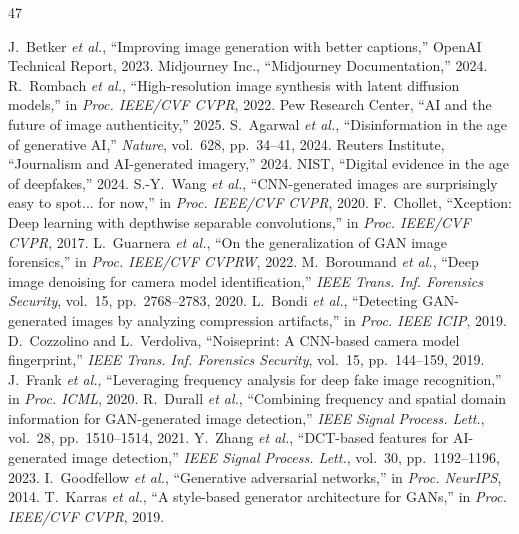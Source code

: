 \documentclass[journal]{IEEEtran}
\begin{document}
\begin{thebibliography}{47}

 J.~Betker \textit{et al.}, ``Improving image generation with better captions,'' OpenAI Technical Report, 2023.
 Midjourney Inc., ``Midjourney Documentation,'' 2024.
 R.~Rombach \textit{et al.}, ``High-resolution image synthesis with latent diffusion models,'' in \textit{Proc. IEEE/CVF CVPR}, 2022.
 Pew Research Center, ``AI and the future of image authenticity,'' 2025.
 S.~Agarwal \textit{et al.}, ``Disinformation in the age of generative AI,'' \textit{Nature}, vol.~628, pp.~34--41, 2024.
 Reuters Institute, ``Journalism and AI-generated imagery,'' 2024.
 NIST, ``Digital evidence in the age of deepfakes,'' 2024.
 S.-Y.~Wang \textit{et al.}, ``CNN-generated images are surprisingly easy to spot... for now,'' in \textit{Proc. IEEE/CVF CVPR}, 2020.
 F.~Chollet, ``Xception: Deep learning with depthwise separable convolutions,'' in \textit{Proc. IEEE/CVF CVPR}, 2017.
 L.~Guarnera \textit{et al.}, ``On the generalization of GAN image forensics,'' in \textit{Proc. IEEE/CVF CVPRW}, 2022.
 M.~Boroumand \textit{et al.}, ``Deep image denoising for camera model identification,'' \textit{IEEE Trans. Inf. Forensics Security}, vol.~15, pp.~2768--2783, 2020.
 L.~Bondi \textit{et al.}, ``Detecting GAN-generated images by analyzing compression artifacts,'' in \textit{Proc. IEEE ICIP}, 2019.
 D.~Cozzolino and L.~Verdoliva, ``Noiseprint: A CNN-based camera model fingerprint,'' \textit{IEEE Trans. Inf. Forensics Security}, vol.~15, pp.~144--159, 2019.
 J.~Frank \textit{et al.}, ``Leveraging frequency analysis for deep fake image recognition,'' in \textit{Proc. ICML}, 2020.
 R.~Durall \textit{et al.}, ``Combining frequency and spatial domain information for GAN-generated image detection,'' \textit{IEEE Signal Process. Lett.}, vol.~28, pp.~1510--1514, 2021.
 Y.~Zhang \textit{et al.}, ``DCT-based features for AI-generated image detection,'' \textit{IEEE Signal Process. Lett.}, vol.~30, pp.~1192--1196, 2023.
 I.~Goodfellow \textit{et al.}, ``Generative adversarial networks,'' in \textit{Proc. NeurIPS}, 2014.
 T.~Karras \textit{et al.}, ``A style-based generator architecture for GANs,'' in \textit{Proc. IEEE/CVF CVPR}, 2019.

\end{thebibliography}
\end{document}
